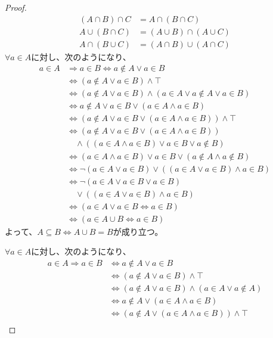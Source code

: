 \documentclass[a4paper]{jsarticle}
\begin{document}
\begin{proof}
\begin{align*}
(A \cap B) \cap C &= A \cap (B \cap C)\\
A \cup (B \cap C) &= (A \cup B) \cap (A \cup C)\\
A \cap (B \cup C) &= (A \cap B) \cup (A \cap C)
\end{align*}
$\forall a \in A$に対し、次のようになり、
\begin{align*}
a \in A &\Rightarrow a \in B \Leftrightarrow a \notin A \vee a \in B\\
&\Leftrightarrow (a \notin A \vee a \in B) \land \top\\
&\Leftrightarrow (a \notin A \vee a \in B) \land (a \in A \vee a \notin A \vee a \in B)\\
&\Leftrightarrow a \notin A \vee a \in B \vee (a \in A \land a \in B)\\
&\Leftrightarrow \left( a \notin A \vee a \in B \vee (a \in A \land a \in B) \right) \land \top\\
&\Leftrightarrow \left( a \notin A \vee a \in B \vee (a \in A \land a \in B) \right) \\
&\quad \land \left( (a \in A \land a \in B) \vee a \in B \vee a \notin B \right)\\
&\Leftrightarrow (a \in A \land a \in B) \vee a \in B \vee (a \notin A \land a \notin B)\\
&\Leftrightarrow \neg(a \in A \vee a \in B) \vee \left( (a \in A \vee a \in B) \land a \in B \right)\\
&\Leftrightarrow \neg(a \in A \vee a \in B \vee a \in B) \\
&\quad \vee \left( (a \in A \vee a \in B) \land a \in B \right)\\
&\Leftrightarrow (a \in A \vee a \in B \Leftrightarrow a \in B)\\
&\Leftrightarrow (a \in A \cup B \Leftrightarrow a \in B)
\end{align*}
よって、$A \subseteq B \Leftrightarrow A \cup B = B$が成り立つ。\par
$\forall a \in A$に対し、次のようになり、
\begin{align*}
a \in A \Rightarrow a \in B &\Leftrightarrow a \notin A \vee a \in B \\
&\Leftrightarrow (a \notin A \vee a \in B) \land \top\\
&\Leftrightarrow (a \notin A \vee a \in B) \land (a \in A \vee a \notin A) \\
&\Leftrightarrow a \notin A \vee (a \in A \land a \in B)\\
&\Leftrightarrow \left( a \notin A \vee (a \in A \land a \in B) \right) \land \top\\

\end{align*}
\end{proof}
\end{document}
